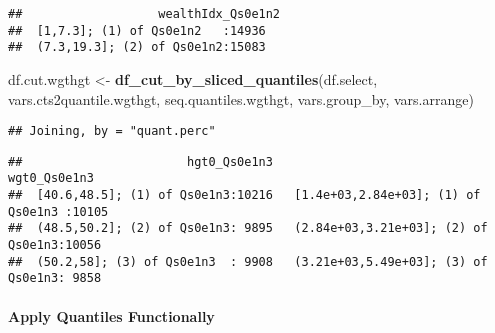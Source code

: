\documentclass[
]{book}
\newenvironment{Shaded}{\begin{snugshade}}{\end{snugshade}}
\newcommand{\CommentTok}[1]{\textcolor[rgb]{0.56,0.35,0.01}{\textit{#1}}}
\newcommand{\KeywordTok}[1]{\textcolor[rgb]{0.13,0.29,0.53}{\textbf{#1}}}
\newcommand{\NormalTok}[1]{#1}
\newcommand{\OperatorTok}[1]{\textcolor[rgb]{0.81,0.36,0.00}{\textbf{#1}}}
\newcommand{\StringTok}[1]{\textcolor[rgb]{0.31,0.60,0.02}{#1}}
\begin{document}
\begin{verbatim}
##                   wealthIdx_Qs0e1n2
##  [1,7.3]; (1) of Qs0e1n2   :14936  
##  (7.3,19.3]; (2) of Qs0e1n2:15083
\end{verbatim}

\begin{Shaded}
\end{Shaded}

\begin{Shaded}
\begin{Highlighting}[]
\NormalTok{df.cut.wgthgt <-}\StringTok{ }\KeywordTok{df_cut_by_sliced_quantiles}\NormalTok{(df.select, vars.cts2quantile.wgthgt, seq.quantiles.wgthgt, vars.group_by, vars.arrange)}
\end{Highlighting}
\end{Shaded}

\begin{verbatim}
## Joining, by = "quant.perc"
\end{verbatim}

\begin{Shaded}
\end{Shaded}

\begin{verbatim}
##                       hgt0_Qs0e1n3                                wgt0_Qs0e1n3  
##  [40.6,48.5]; (1) of Qs0e1n3:10216   [1.4e+03,2.84e+03]; (1) of Qs0e1n3 :10105  
##  (48.5,50.2]; (2) of Qs0e1n3: 9895   (2.84e+03,3.21e+03]; (2) of Qs0e1n3:10056  
##  (50.2,58]; (3) of Qs0e1n3  : 9908   (3.21e+03,5.49e+03]; (3) of Qs0e1n3: 9858
\end{verbatim}

\hypertarget{apply-quantiles-functionally}{%
\paragraph{Apply Quantiles Functionally}\label{apply-quantiles-functionally}}
\end{document}
